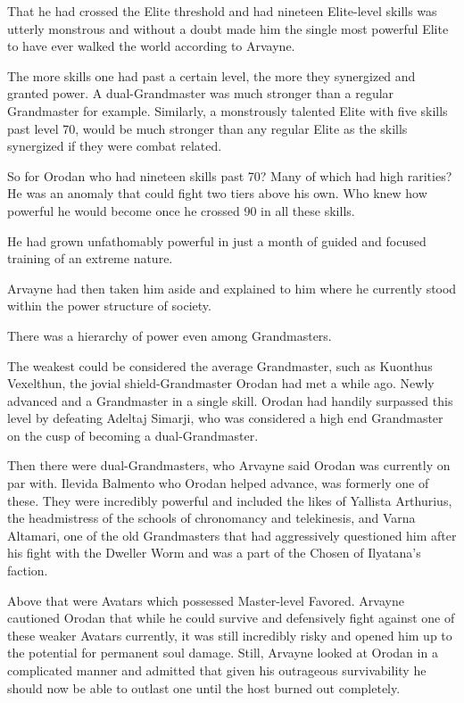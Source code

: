 \documentclass[a4paper,10pt]{book}
\begin{document}
That he had crossed the Elite threshold and had nineteen Elite-level skills was utterly monstrous and without a doubt made him the single most powerful Elite to have ever walked the world according to Arvayne.\par
The more skills one had past a certain level, the more they synergized and granted power. A dual-Grandmaster was much stronger than a regular Grandmaster for example. Similarly, a monstrously talented Elite with five skills past level 70, would be much stronger than any regular Elite as the skills synergized if they were combat related.\par
So for Orodan who had nineteen skills past 70? Many of which had high rarities? He was an anomaly that could fight two tiers above his own. Who knew how powerful he would become once he crossed 90 in all these skills.\par
He had grown unfathomably powerful in just a month of guided and focused training of an extreme nature.\par
Arvayne had then taken him aside and explained to him where he currently stood within the power structure of society.\par
There was a hierarchy of power even among Grandmasters.\par
The weakest could be considered the average Grandmaster, such as Kuonthus Vexelthun, the jovial shield-Grandmaster Orodan had met a while ago. Newly advanced and a Grandmaster in a single skill. Orodan had handily surpassed this level by defeating Adeltaj Simarji, who was considered a high end Grandmaster on the cusp of becoming a dual-Grandmaster.\par
Then there were dual-Grandmasters, who Arvayne said Orodan was currently on par with. Ilevida Balmento who Orodan helped advance, was formerly one of these. They were incredibly powerful and included the likes of Yallista Arthurius, the headmistress of the schools of chronomancy and telekinesis, and Varna Altamari, one of the old Grandmasters that had aggressively questioned him after his fight with the Dweller Worm and was a part of the Chosen of Ilyatana’s faction.\par
Above that were Avatars which possessed Master-level Favored. Arvayne cautioned Orodan that while he could survive and defensively fight against one of these weaker Avatars currently, it was still incredibly risky and opened him up to the potential for permanent soul damage. Still, Arvayne looked at Orodan in a complicated manner and admitted that given his outrageous survivability he should now be able to outlast one until the host burned out completely.\par
\end{document}
